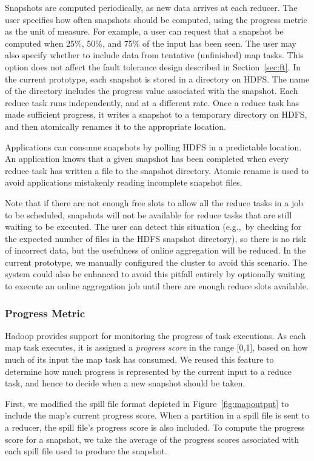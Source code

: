 Snapshots are computed periodically, as new data arrives at each reducer. The
user specifies how often snapshots should be computed, using the progress metric
as the unit of measure. For example, a user can request that a snapshot be
computed when 25\%, 50\%, and 75\% of the input has been seen. The user may also
specify whether to include data from tentative (unfinished) map tasks. This
option does not affect the fault tolerance design described in
Section~\ref{sec:ft}. In the current prototype, each snapshot is stored in a
directory on HDFS\@. The name of the directory includes the progress value
associated with the snapshot. Each reduce task runs independently, and at a
different rate. Once a reduce task has made sufficient progress, it writes a
snapshot to a temporary directory on HDFS, and then atomically renames it to the
appropriate location.

Applications can consume snapshots by polling HDFS in a predictable
location. An application knows that a given snapshot has been
completed when every reduce task has written a file to the snapshot
directory.  Atomic rename is used to avoid applications mistakenly
reading incomplete snapshot files.

Note that if there are not enough free slots to allow all the reduce tasks in a
job to be scheduled, snapshots will not be available for reduce tasks that are
still waiting to be executed. The user can detect this situation (e.g.,\ by
checking for the expected number of files in the HDFS snapshot directory), so
there is no risk of incorrect data, but the usefulness of online aggregation
will be reduced. In the current prototype, we manually configured the cluster to
avoid this scenario. The system could also be enhanced to avoid this pitfall
entirely by optionally waiting to execute an online aggregation job until there
are enough reduce slots available.

\subsubsection{Progress Metric}
\label{sec:online-metric}
Hadoop provides support for monitoring the progress of task
executions. As each map task executes, it is assigned a \emph{progress
  score} in the range [0,1], based on how much of its input the map
task has consumed. We reused this feature to determine how much
progress is represented by the current input to a reduce task, and
hence to decide when a new snapshot should be taken.

First, we modified the spill file format depicted in
Figure~\ref{fig:mapoutput} to include the map's current progress
score. When a partition in a spill file is sent to a reducer, the
spill file's progress score is also included. To compute the progress
score for a snapshot, we take the average of the progress scores
associated with each spill file used to produce the snapshot.

